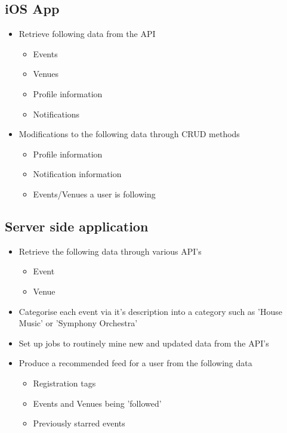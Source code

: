 \documentclass[11pt,fleqn,twoside]{article}
\begin{document}
			\subsection{iOS App}

				\begin{itemize}
					\item Retrieve following data from the API
					\begin{itemize}	
						\item Events
						\item Venues
						\item Profile information
						\item Notifications
					\end{itemize}
					\item Modifications to the following data through CRUD methods
					\begin{itemize}
						\item Profile information 
						\item Notification information
						\item Events/Venues a user is following
					\end{itemize}
				\end{itemize}
				
			\subsection{Server side application}
				\begin{itemize}
				\item Retrieve the following data through various API's 
					\begin{itemize}	
						\item Event
						\item Venue 
					\end{itemize}
				\item Categorise each event via it's description into a category such as 'House Music' or 'Symphony Orchestra'
				\item Set up jobs to routinely mine new and updated data from the API's 
				\item Produce a recommended feed for a user from the following data
					\begin{itemize}
						\item Registration tags
						\item Events and Venues being 'followed'
						\item Previously starred events 
					\end{itemize}
				\end{itemize}
\end{document}
